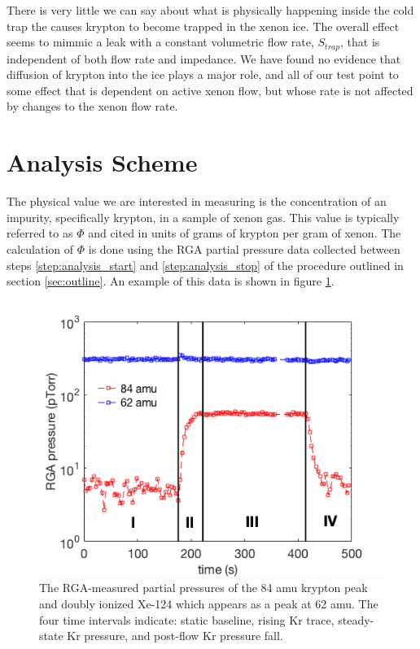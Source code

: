 There is very little we can say about what is physically happening inside the cold trap the causes krypton to become trapped in the xenon ice. The overall effect seems to mimmic a leak with a constant volumetric flow rate, $S_{trap}$, that is independent of both flow rate and impedance. We have found no evidence that diffusion of krypton into the ice plays a major role, and all of our test point to some effect that is dependent on active xenon flow, but whose rate is not affected by changes to the xenon flow rate.

\section{Analysis Scheme}\label{sec:anscheme}
The physical value we are interested in measuring is the concentration of an impurity, specifically krypton, in a sample of xenon gas. This value is typically referred to as $\Phi$ and cited in units of grams of krypton per gram of xenon. The calculation of $\Phi$ is done using the RGA partial pressure data collected between steps \ref{step:analysis_start} and \ref{step:analysis_stop} of the procedure outlined in section \ref{sec:outline}. An example of this data is shown in figure \ref{fig:RGAtrace}. 

\begin{figure}[h!]
  \includegraphics[width=\linewidth]{Figures/RGA_trace.png}
  \caption{The RGA-measured partial pressures of the 84 amu krypton peak and doubly ionized Xe-124 which appears as a peak at 62 amu. The four time intervals indicate: static baseline, rising Kr trace, steady-state Kr pressure, and post-flow Kr pressure fall.}
  \label{fig:RGAtrace}
\end{figure}

